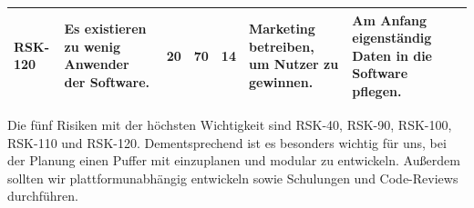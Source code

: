 \begin{landscape}
\begin{longtable}{|p{1.5cm}|p{4.5cm}|p{0.4cm}|p{0.4cm}|p{0.8cm}|p{4.5cm}|p{4.5cm}|}
		\\ \hline
		
		RSK-120	& Es existieren zu wenig Anwender der Software.
				& 20 	& 70 	& 14 	& Marketing betreiben, um Nutzer zu gewinnen.
								& Am Anfang eigenständig Daten in die Software pflegen.

		\\ \hline

	\end{longtable}

	Die fünf Risiken mit der höchsten Wichtigkeit sind RSK-40, RSK-90, RSK-100, RSK-110 und RSK-120. Dementsprechend ist es besonders wichtig für uns, bei der Planung einen Puffer mit einzuplanen und modular zu entwickeln. Außerdem sollten wir plattformunabhängig entwickeln sowie Schulungen und Code-Reviews durchführen. 
	
\end{landscape}
